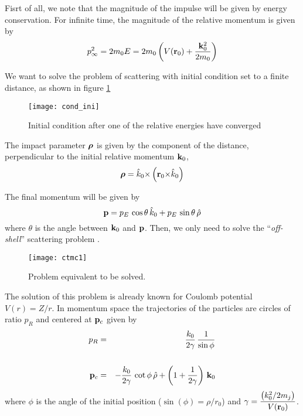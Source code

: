 Fisrt of all, we note that the magnitude of the impulse will be given by energy conservation. For infinite time, the magnitude of the relative momentum is given by
\begin{equation}
  \label{Q:ctmc_magnitude}
p_{\infty}^{2}= 2 m_{0} E = 2 m_{0} \left(V(\mathbf{r}_{0}) + \frac{\mathbf{k}^{2}_{0}}{2 m_{0}}  \right)
\end{equation}

We want to solve the problem of scattering with initial condition set
to a finite distance, as shown in figure \ref{f:cond-ini}

\begin{figure}[h]\label{f:cond-ini}
\centering \texttt{[image: cond\_ini]}
\caption{Initial condition after one of the relative energies have
converged}
\end{figure}

The impact parameter $\boldsymbol{\rho}$ is given by the component of the distance,
perpendicular to the initial relative momentum $\mathbf{k}_{0}$,
\begin{equation}\label{Q:rho}
\boldsymbol{\rho} = \hat{k}_{0} {\times} \left( \mathbf{r}_{0} {\times} \hat{k}_{0} \right)
\end{equation}

The final momentum will be given by
\begin{equation}\label{Q:finalmom}
\mathbf{p} = p_{E} \, \cos{\theta} \, \hat{k}_{0}+ p_{E}\, \sin{\theta}\,
\hat{\rho}
\end{equation}
%
where $\theta $ is the angle between $\mathbf{k}_{0}$ and $\mathbf{p}$. Then,
we only need to solve the ``\textit{off-shell}'' scattering problem
\autocite{Fiol2000JPBp2847}.

\begin{figure}[!htpb]
  \centering
 \texttt{[image: ctmc1]}
  \caption{Problem equivalent to be solved.
  \label{f:ctmc1}}
\end{figure}


The solution of this problem is already known for Coulomb potential
$V(r) = Z/r$. In momentum space the trajectories of the particles are
circles of ratio $p_{R}$ and centered at $\mathbf{p}_{c}$ given by
\begin{eqnarray}\label{Q:circle-mom}
p_{R} &=& \frac{k_{0}}{2 \gamma} \, \frac{1}{\sin{\phi}} \nonumber \\
\\
\mathbf{p}_{c} &=& - \frac{k_{0}}{2 \gamma } \, \cot{\phi}\, \hat{\rho} +
\left( 1 + \frac{1}{2 \gamma} \right) \, \mathbf{k}_{0} \nonumber
\end{eqnarray}
where $\phi$ is the angle of the initial position ($\sin(\phi) =
\rho/r_{0}$) and $\displaystyle{\gamma = \frac{\left( k_{0}^{2}/2 m_{j}
\right)}{V(\mathbf{r}_{0})}}$.

